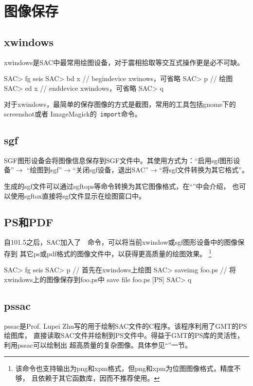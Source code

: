 \section{图像保存}
\label{sec:save-image}

\subsection{xwindows}
xwindows是SAC中最常用绘图设备，对于震相拾取等交互式操作更是必不可缺。
\begin{SACCode}
SAC> fg seis
SAC> bd x       // begindevice xwinows，可省略
SAC> p          // 绘图
SAC> ed x       // enddevice xwindows，可省略
SAC> q
\end{SACCode}

对于xwindows，最简单的保存图像的方式是截图，常用的工具包括gnome下的screenshot或者
ImageMagick的~\verb+import+命令。

\subsection{sgf}
SGF图形设备会将图像信息保存到SGF文件中。其使用方式为：``启用sgf图形设备''$\rightarrow$
``绘图到sgf''$\rightarrow$``关闭sgf设备，退出SAC''$\rightarrow$``将sgf文件转换为其它格式''。

生成的sgf文件可以通过sgftops等命令转换为其它图像格式，在``''中会介绍，
也可以使用sgftox直接将sgf文件显示在绘图窗口中。

\subsection{PS和PDF}
自101.5之后，SAC加入了~~命令，可以将当前xwindow或sgf图形设备中的图像保存到
其它ps或pdf格式的图像文件中，以获得更高质量的绘图效果。
\footnote{该命令也支持输出为png和xpm格式，但png和xpm为位图图像格式，精度不够，
且依赖于其它函数库，因而不推荐使用。}

\begin{SACCode}
SAC> fg seis
SAC> p                      // 首先在xwindows上绘图
SAC> saveimg foo.ps         // 将xwindows上的图像保存到foo.ps中
save file foo.ps [PS]
SAC> q
\end{SACCode}

\subsection{pssac}
pssac是Prof. Lupei Zhu写的用于绘制SAC文件的C程序。该程序利用了GMT的PS绘图库，
直接读取SAC文件并绘制到PS文件中。得益于GMT的PS库的灵活性，利用pssac可以绘制出
超高质量的复杂图像。具体参见``''一节。

